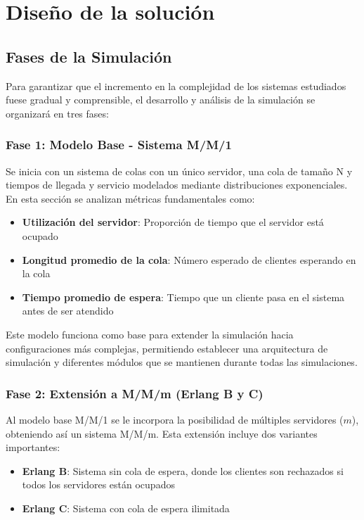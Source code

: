 \documentclass{article}
\begin{document}
\section{Diseño de la solución} \label{sec:disSol}

\subsection{Fases de la Simulación}

Para garantizar que el incremento en la complejidad de los sistemas estudiados fuese gradual y comprensible, el desarrollo y análisis de la simulación se organizará en tres fases:

\subsubsection{Fase 1: Modelo Base - Sistema M/M/1}

Se inicia con un sistema de colas con un único servidor, una cola de tamaño N y tiempos de llegada y servicio modelados mediante distribuciones exponenciales. En esta sección se analizan métricas fundamentales como:

\begin{itemize}
    \item \textbf{Utilización del servidor}: Proporción de tiempo que el servidor está ocupado
    \item \textbf{Longitud promedio de la cola}: Número esperado de clientes esperando en la cola
    \item \textbf{Tiempo promedio de espera}: Tiempo que un cliente pasa en el sistema antes de ser atendido
\end{itemize}

Este modelo funciona como base para extender la simulación hacia configuraciones más complejas, permitiendo establecer una arquitectura de simulación y diferentes módulos que se mantienen durante todas las simulaciones.

\subsubsection{Fase 2: Extensión a M/M/m (Erlang B y C)}

Al modelo base M/M/1 se le incorpora la posibilidad de múltiples servidores ($m$), obteniendo así un sistema M/M/m. Esta extensión incluye dos variantes importantes:

\begin{itemize}
    \item \textbf{Erlang B}: Sistema sin cola de espera, donde los clientes son rechazados si todos los servidores están ocupados
    \item \textbf{Erlang C}: Sistema con cola de espera ilimitada
\end{itemize}
\end{document}
